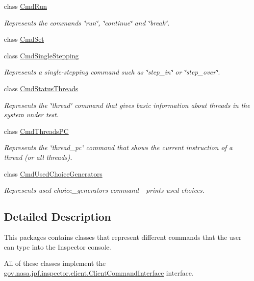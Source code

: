 \begin{DoxyCompactItemize}
class \hyperlink{classgov_1_1nasa_1_1jpf_1_1inspector_1_1client_1_1commands_1_1_cmd_run}{Cmd\+Run}
\begin{DoxyCompactList}\small\item\em Represents the commands \char`\"{}run\char`\"{}, \char`\"{}continue\char`\"{} and \char`\"{}break\char`\"{}. \end{DoxyCompactList}\item 
class \hyperlink{classgov_1_1nasa_1_1jpf_1_1inspector_1_1client_1_1commands_1_1_cmd_set}{Cmd\+Set}
\item 
class \hyperlink{classgov_1_1nasa_1_1jpf_1_1inspector_1_1client_1_1commands_1_1_cmd_single_stepping}{Cmd\+Single\+Stepping}
\begin{DoxyCompactList}\small\item\em Represents a single-\/stepping command such as \char`\"{}step\+\_\+in\char`\"{} or \char`\"{}step\+\_\+over\char`\"{}. \end{DoxyCompactList}\item 
class \hyperlink{classgov_1_1nasa_1_1jpf_1_1inspector_1_1client_1_1commands_1_1_cmd_status_threads}{Cmd\+Status\+Threads}
\begin{DoxyCompactList}\small\item\em Represents the \char`\"{}thread\char`\"{} command that gives basic information about threads in the system under test. \end{DoxyCompactList}\item 
class \hyperlink{classgov_1_1nasa_1_1jpf_1_1inspector_1_1client_1_1commands_1_1_cmd_threads_p_c}{Cmd\+Threads\+PC}
\begin{DoxyCompactList}\small\item\em Represents the \char`\"{}thread\+\_\+pc\char`\"{} command that shows the current instruction of a thread (or all threads). \end{DoxyCompactList}\item 
class \hyperlink{classgov_1_1nasa_1_1jpf_1_1inspector_1_1client_1_1commands_1_1_cmd_used_choice_generators}{Cmd\+Used\+Choice\+Generators}
\begin{DoxyCompactList}\small\item\em Represents used choice\+\_\+generators command -\/ prints used choices. \end{DoxyCompactList}\end{DoxyCompactItemize}


\subsection{Detailed Description}
This packages contains classes that represent different commands that the user can type into the Inspector console. 

All of these classes implement the \hyperlink{interfacegov_1_1nasa_1_1jpf_1_1inspector_1_1client_1_1_client_command_interface}{gov.\+nasa.\+jpf.\+inspector.\+client.\+Client\+Command\+Interface} interface. 